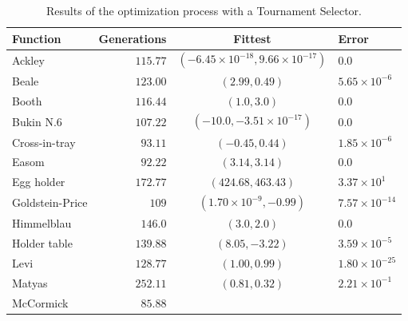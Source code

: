       \label{tab:fn_opt:results:time}

      \centering
      \begin{longtable}{|l|r|c|l|}
        \caption{Results of the optimization process with a Tournament Selector.}
        \\
        \hline
        Function  & Generations & Fittest & Error \\
        \hline\hline
        Ackley	          & $115.77$	
                          & $(-6.45 \times 10^{-18}, 9.66 \times 10^{-17})$	
                          & $0.0$\\\hline
        Beale	            & $123.00$	
                          & $(2.99, 0.49)$	
                          & $5.65 \times 10^{-6}$\\\hline
        Booth	            & $116.44$	
                          & $(1.0, 3.0)$	
                          & $0.0$\\\hline
        Bukin N.6	        & $107.22$	
                          & $(-10.0, -3.51 \times 10^{-17})$	
                          & $0.0$\\\hline
        Cross-in-tray	    & $93.11$	
                          & $(-0.45, 0.44)$	
                          & $1.85 \times 10^{-6}$\\\hline
        Easom	            & $92.22$	
                          & $(3.14, 3.14)$	
                          & $0.0$\\\hline
        Egg holder	      & $172.77$	
                          & $(424.68, 463.43)$	
                          & $3.37 \times 10^1$\\\hline
        Goldstein-Price	  & $109$	
                          & $(1.70 \times 10^{-9}, -0.99)$	
                          & $7.57 \times 10^{-14}$\\\hline
        Himmelblau	      & $146.0$
                          & $(3.0, 2.0)$
                          & $0.0$\\\hline
        Holder table	    & $139.88$	
                          & $(8.05, -3.22)$	
                          & $3.59 \times 10^{-5}$\\\hline
        Levi	            & $128.77$	
                          & $(1.00, 0.99)$	
                          & $1.80 \times 10^{-25}$\\\hline
        Matyas	          & $252.11$	
                          & $(0.81, 0.32)$	
                          & $2.21 \times 10^{-1}$\\\hline
        McCormick	        & $85.88$	

\end{longtable}
